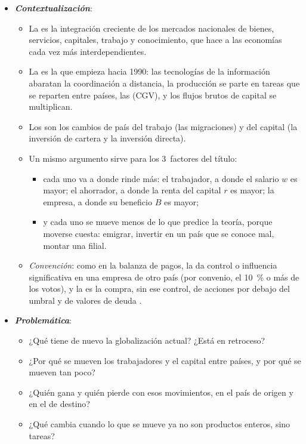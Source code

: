 \documentclass[11pt]{article}
\begin{document}
\begin{itemize}
\item \textbf{\emph{Contextualización}}:
  \begin{itemize}
  \item La  es la integración creciente de los mercados nacionales de bienes, servicios, capitales, trabajo y conocimiento, que hace a las economías cada vez más interdependientes.
  \item La  es la que empieza hacia 1990: las tecnologías de la información abaratan la coordinación a distancia, la producción se parte en tareas que se reparten entre países, las  (CGV), y los flujos brutos de capital se multiplican\nocite{Baldwin2016Convergence}.
  \item Los  son los cambios de país del trabajo (las migraciones) y del capital (la inversión de cartera y la inversión directa).
  \item Un mismo argumento sirve para los 3~factores del título:
    \begin{itemize}
    \item cada uno va a donde rinde más: el trabajador, a donde el salario $w$ es mayor; el ahorrador, a donde la renta del capital $r$ es mayor; la empresa, a donde su beneficio $B$ es mayor;
    \item y cada uno se mueve menos de lo que predice la teoría, porque moverse cuesta: emigrar, invertir en un país que se conoce mal, montar una filial.
    \end{itemize}
  \item \emph{Convención}: como en la balanza de pagos, la  da control o influencia significativa en una empresa de otro país (por convenio, el 10~\% o más de los votos), y la  es la compra, sin ese control, de acciones por debajo del umbral y de valores de deuda\nocite{FMI2009MBP6} .
  \end{itemize}

\item \textbf{\emph{Problemática}}:
  \begin{itemize}
  \item ¿Qué tiene de nuevo la globalización actual? ¿Está en retroceso?
  \item ¿Por qué se mueven los trabajadores y el capital entre países, y por qué se mueven tan poco?
  \item ¿Quién gana y quién pierde con esos movimientos, en el país de origen y en el de destino?
  \item ¿Qué cambia cuando lo que se mueve ya no son productos enteros, sino tareas?
  \end{itemize}


\end{itemize}
\end{document}
